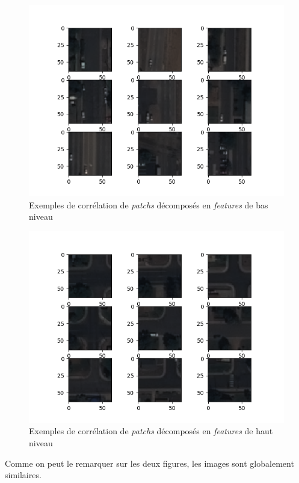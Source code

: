 \documentclass[a4paper, 11pt]{report}
\begin{document}
\begin{figure}[H]
	\centering
	\includegraphics[scale=0.9]{Images/CommerceCity_Correlation_1.png}
	\caption{Exemples de corrélation de \emph{patchs} décomposés en \emph{features} de bas niveau}
\end{figure}

\begin{figure}[H]
	\centering
	\includegraphics[scale=0.9]{Images/CommerceCity_Correlation_2.png}
	\caption{Exemples de corrélation de \emph{patchs} décomposés en \emph{features} de haut niveau}
\end{figure}

Comme on peut le remarquer sur les deux figures, les images sont globalement similaires.
\end{document}
